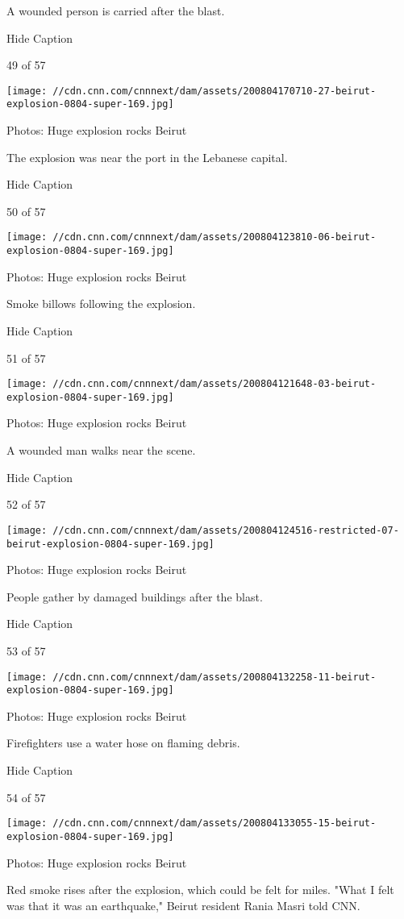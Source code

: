A wounded person is carried after the blast.

Hide Caption

49 of 57

\texttt{[image: //cdn.cnn.com/cnnnext/dam/assets/200804170710-27-beirut-explosion-0804-super-169.jpg]}

Photos: Huge explosion rocks Beirut

The explosion was near the port in the Lebanese capital.

Hide Caption

50 of 57

\texttt{[image: //cdn.cnn.com/cnnnext/dam/assets/200804123810-06-beirut-explosion-0804-super-169.jpg]}

Photos: Huge explosion rocks Beirut

Smoke billows following the explosion.

Hide Caption

51 of 57

\texttt{[image: //cdn.cnn.com/cnnnext/dam/assets/200804121648-03-beirut-explosion-0804-super-169.jpg]}

Photos: Huge explosion rocks Beirut

A wounded man walks near the scene.

Hide Caption

52 of 57

\texttt{[image: //cdn.cnn.com/cnnnext/dam/assets/200804124516-restricted-07-beirut-explosion-0804-super-169.jpg]}

Photos: Huge explosion rocks Beirut

People gather by damaged buildings after the blast.

Hide Caption

53 of 57

\texttt{[image: //cdn.cnn.com/cnnnext/dam/assets/200804132258-11-beirut-explosion-0804-super-169.jpg]}

Photos: Huge explosion rocks Beirut

Firefighters use a water hose on flaming debris.

Hide Caption

54 of 57

\texttt{[image: //cdn.cnn.com/cnnnext/dam/assets/200804133055-15-beirut-explosion-0804-super-169.jpg]}

Photos: Huge explosion rocks Beirut

Red smoke rises after the explosion, which could be felt for miles.
"What I felt was that it was an earthquake," Beirut resident Rania Masri
told CNN.

